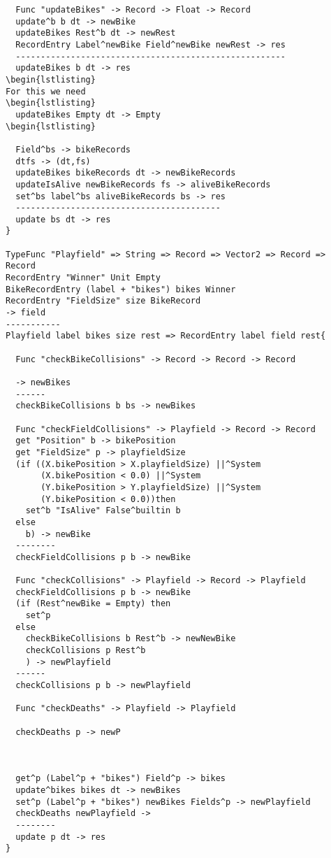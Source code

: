 \begin{lstlisting}
  Func "updateBikes" -> Record -> Float -> Record
  update^b b dt -> newBike
  updateBikes Rest^b dt -> newRest
  RecordEntry Label^newBike Field^newBike newRest -> res
  ------------------------------------------------------
  updateBikes b dt -> res
\begin{lstlisting}
For this we need
\begin{lstlisting}
  updateBikes Empty dt -> Empty
\begin{lstlisting}

  Field^bs -> bikeRecords
  dtfs -> (dt,fs)
  updateBikes bikeRecords dt -> newBikeRecords
  updateIsAlive newBikeRecords fs -> aliveBikeRecords
  set^bs label^bs aliveBikeRecords bs -> res
  -----------------------------------------
  update bs dt -> res
}

TypeFunc "Playfield" => String => Record => Vector2 => Record => Record
RecordEntry "Winner" Unit Empty
BikeRecordEntry (label + "bikes") bikes Winner
RecordEntry "FieldSize" size BikeRecord
-> field
-----------
Playfield label bikes size rest => RecordEntry label field rest{

  Func "checkBikeCollisions" -> Record -> Record -> Record

  -> newBikes
  ------
  checkBikeCollisions b bs -> newBikes

  Func "checkFieldCollisions" -> Playfield -> Record -> Record
  get "Position" b -> bikePosition
  get "FieldSize" p -> playfieldSize
  (if ((X.bikePosition > X.playfieldSize) ||^System
       (X.bikePosition < 0.0) ||^System
       (Y.bikePosition > Y.playfieldSize) ||^System
       (Y.bikePosition < 0.0))then
    set^b "IsAlive" False^builtin b
  else
    b) -> newBike
  --------
  checkFieldCollisions p b -> newBike

  Func "checkCollisions" -> Playfield -> Record -> Playfield
  checkFieldCollisions p b -> newBike
  (if (Rest^newBike = Empty) then
    set^p
  else
    checkBikeCollisions b Rest^b -> newNewBike
    checkCollisions p Rest^b
    ) -> newPlayfield
  ------
  checkCollisions p b -> newPlayfield

  Func "checkDeaths" -> Playfield -> Playfield

  checkDeaths p -> newP



  get^p (Label^p + "bikes") Field^p -> bikes
  update^bikes bikes dt -> newBikes
  set^p (Label^p + "bikes") newBikes Fields^p -> newPlayfield
  checkDeaths newPlayfield ->
  --------
  update p dt -> res
}
\end{lstlisting}

